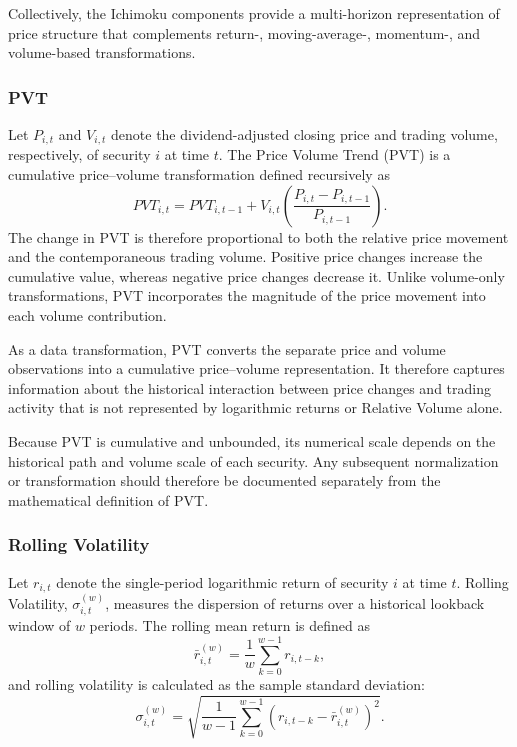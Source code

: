 Collectively, the Ichimoku components provide a multi-horizon representation of price structure that complements return-, moving-average-, momentum-, and volume-based transformations.

\subsubsection{\acf{PVT}}

Let $P_{i,t}$ and $V_{i,t}$ denote the dividend-adjusted closing price and trading volume, respectively, of security $i$ at time $t$. The Price Volume Trend (PVT) is a cumulative price--volume transformation defined recursively as
\begin{equation}
	PVT_{i,t}=PVT_{i,t-1}+V_{i,t}\left(\frac{P_{i,t}-P_{i,t-1}}{P_{i,t-1}}\right).
\end{equation}
The change in PVT is therefore proportional to both the relative price movement and the contemporaneous trading volume. Positive price changes increase the cumulative value, whereas negative price changes decrease it. Unlike volume-only transformations, PVT incorporates the magnitude of the price movement into each volume contribution.

\medskip

As a data transformation, PVT converts the separate price and volume observations into a cumulative price--volume representation. It therefore captures information about the historical interaction between price changes and trading activity that is not represented by logarithmic returns or Relative Volume alone.

\medskip

Because PVT is cumulative and unbounded, its numerical scale depends on the historical path and volume scale of each security. Any subsequent normalization or transformation should therefore be documented separately from the mathematical definition of PVT.

\subsubsection{Rolling Volatility}
Let $r_{i,t}$ denote the single-period logarithmic return of security $i$ at time $t$. Rolling Volatility, $\sigma_{i,t}^{(w)}$, measures the dispersion of returns over a historical lookback window of $w$ periods. The rolling mean return is defined as
\begin{equation}
	\bar{r}_{i,t}^{(w)}=\frac{1}{w}\sum_{k=0}^{w-1}r_{i,t-k},
\end{equation}
and rolling volatility is calculated as the sample standard deviation:
\begin{equation}
	\sigma_{i,t}^{(w)}=\sqrt{\frac{1}{w-1}\sum_{k=0}^{w-1}\left(r_{i,t-k}-\bar{r}_{i,t}^{(w)}\right)^2}.
\end{equation}

